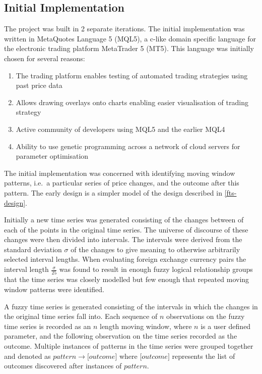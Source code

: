 \documentclass{article}
\theoremstyle{definition}
\begin{document}
\label{implementation}

\subsection{Initial Implementation}

The project was built in 2 separate iterations. The initial implementation was written in MetaQuotes Language 5 (MQL5), a c-like domain specific language for the electronic trading platform MetaTrader 5 (MT5). This language was initially chosen for several reasons:

\begin{enumerate}[label=\roman*]
\item The trading platform enables testing of automated trading strategies using past price data
\item Allows drawing overlays onto charts enabling easier visualisation of trading strategy
\item Active community of developers using MQL5 and the earlier MQL4
\item Ability to use genetic programming across a network of cloud servers for parameter optimisation
\end{enumerate}

The initial implementation was concerned with identifying moving window patterns, i.e.\ a particular series of price changes, and the outcome after this pattern. The early design is a simpler model of the design described in \cref{fts-design}.

Initially a new time series was generated consisting of the changes between of each of the points in the original time series. The universe of discourse of these changes were then divided into intervals. The intervals were derived from the standard deviation $\sigma$ of the changes to give meaning to otherwise arbitrarily selected interval lengths. When evaluating foreign exchange currency pairs the interval length $\frac{\sigma}{25}$ was found to result in enough fuzzy logical relationship groups that the time series was closely modelled but few enough that repeated moving window patterns were identified.

A fuzzy time series is generated consisting of the intervals in which the changes in the original time series fall into. Each sequence of $n$ observations on the fuzzy time series is recorded as an $n$ length moving window, where $n$ is a user defined parameter, and the following observation on the time series recorded as the outcome. Multiple instances of patterns in the time series were grouped together and denoted as $pattern \rightarrow \lbrack outcome\rbrack$ where $\lbrack outcome\rbrack$ represents the list of outcomes discovered after instances of $pattern$.
\end{document}
